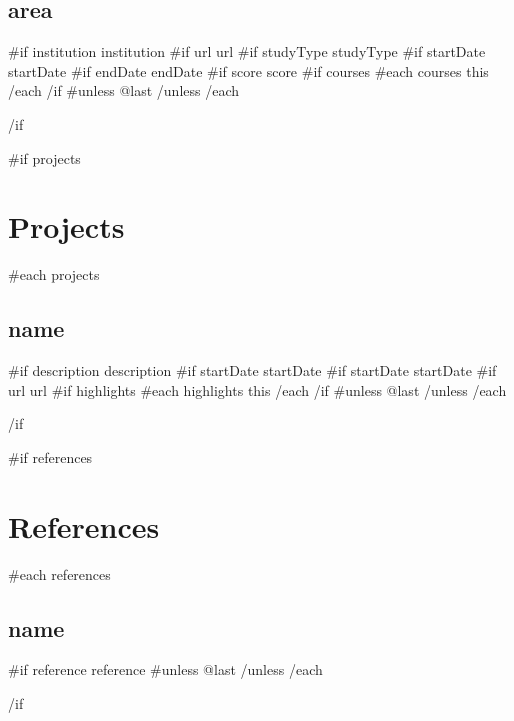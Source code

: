 \documentclass[letterpaper]{article}
\newcommand{\sectionsep}[0]{}
\newcommand{\subsectionsep}[0]{}
\begin{document}
\begin{minipage}[t]{0.75\textwidth}
{    \subsection*{ {{ area }} } {
      {{#if institution}}{{ institution }}
      {{#if url}}{{ url }}
      {{#if studyType}}{{ studyType }}
      {{#if startDate}}{{ startDate }}
      {{#if endDate}}{{ endDate }}
      {{#if score}}{{ score }}
      {{#if courses}}
        {{#each courses}}
          {{ this }} 
        {{/each}}\newline
      {{/if}}
    }
    {{#unless @last}} \subsectionsep {{/unless}}
    {{/each}}
  }
  \sectionsep
  {{/if}}

  {{#if projects}}
  \section*{Projects} {
    {{#each projects}}
    \subsection*{ {{ name }} } {
      {{#if description}}{{ description }}
      {{#if startDate}}{{ startDate }}
      {{#if startDate}}{{ startDate }}
      {{#if url}}{{ url }}
      {{#if highlights}}
        {{#each highlights}}
          {{ this }} 
        {{/each}}\newline
      {{/if}}
    }
    {{#unless @last}} \subsectionsep {{/unless}}
    {{/each}}
  }
  \sectionsep
  {{/if}}

  {{#if references}}
  \section*{References} {
    {{#each references}}
    \subsection*{ {{ name }} } {
      {{#if reference}}{{ reference }}
    }
    {{#unless @last}} \subsectionsep {{/unless}}
    {{/each}}
  }
  {{/if}}


\end{minipage}
\end{document}
